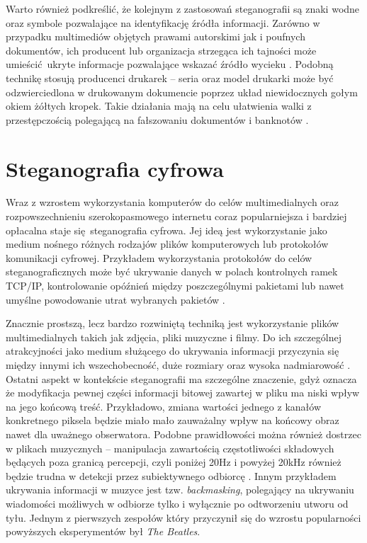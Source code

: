 {{        %
        Warto również podkreślić, że kolejnym z zastosowań steganografii są znaki wodne oraz symbole pozwalające na
        identyfikację źródła informacji. Zarówno w przypadku multimediów objętych prawami autorskimi jak i poufnych
        dokumentów, ich producent lub organizacja strzegąca ich tajności może umieścić ukryte informacje pozwalające
        wskazać źródło wycieku \cite{Nasereddin2011DIGITALWA}. Podobną technikę stosują producenci drukarek -- seria
        oraz model drukarki może być odzwierciedlona w drukowanym dokumencie poprzez układ niewidocznych gołym okiem
        żółtych kropek. Takie działania mają na celu ułatwienia walki z przestępczością polegającą na fałszowaniu
        dokumentów i banknotów \cite{Richter2018ForensicAA}.}

    \section{Steganografia cyfrowa}
    {
        Wraz z wzrostem wykorzystania komputerów do celów multimedialnych oraz rozpowszechnieniu szerokopasmowego
        internetu coraz popularniejsza i bardziej opłacalna staje się steganografia cyfrowa. Jej ideą jest wykorzystanie
        jako medium nośnego różnych rodzajów plików komputerowych lub protokołów komunikacji cyfrowej. Przykładem
        wykorzystania protokołów do celów steganograficznych może być ukrywanie danych w polach kontrolnych ramek
        TCP/IP, kontrolowanie opóźnień między poszczególnymi pakietami lub nawet umyślne powodowanie utrat wybranych
        pakietów \cite{DataHidinginTCP}.

        Znacznie prostszą, lecz bardzo rozwiniętą techniką jest wykorzystanie plików multimedialnych takich jak zdjęcia,
        pliki muzyczne i filmy. Do ich szczególnej atrakcyjności jako medium służącego do ukrywania informacji przyczynia
        się między innymi ich wszechobecność, duże rozmiary oraz wysoka nadmiarowość \cite{Mitchell2018H264ED,
        Pope2012DigitalS}. Ostatni aspekt w kontekście steganografii ma szczególne znaczenie, gdyż oznacza że
        modyfikacja pewnej części informacji bitowej zawartej w pliku ma niski wpływ na jego końcową treść. Przykładowo,
        zmiana wartości jednego z kanałów konkretnego piksela będzie miało mało zauważalny wpływ na końcowy obraz nawet
        dla uważnego obserwatora. Podobne prawidłowości można również dostrzec w plikach muzycznych -- manipulacja
        zawartością częstotliwości składowych będących poza granicą percepcji, czyli poniżej 20Hz i powyżej 20kHz
        również będzie trudna w detekcji przez subiektywnego odbiorcę \cite{Wheeler2012AudioSU}. Innym przykładem
        ukrywania informacji w muzyce jest tzw. \textit{backmasking}, polegający na ukrywaniu wiadomości możliwych w
        odbiorze tylko i wyłącznie po odtworzeniu utworu od tyłu. Jednym z pierwszych zespołów który przyczynił się do
        wzrostu popularności powyższych eksperymentów był \textit{The Beatles}.
    }

}
